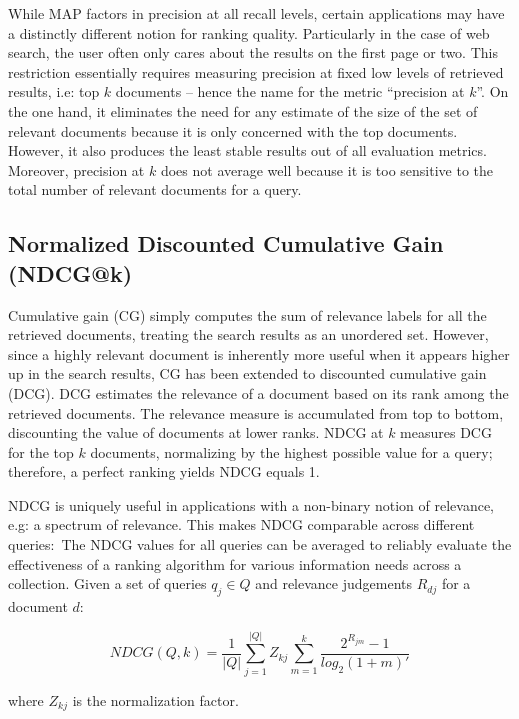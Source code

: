 While MAP factors in precision at all recall levels, certain applications may have a distinctly different notion for ranking quality.
Particularly in the case of web search, the user often only cares about the results on the first page or two.
This restriction essentially requires measuring precision at fixed low levels of retrieved results, i.e: top $ k $ documents -- hence the name for the metric ``precision at $ k $''.
On the one hand, it eliminates the need for any estimate of the size of the set of relevant documents because it is only concerned with the top documents.
However, it also produces the least stable results out of all evaluation metrics.
Moreover, precision at $ k $ does not average well because it is too sensitive to the total number of relevant documents for a query.

\subsection{Normalized Discounted Cumulative Gain (NDCG@k)}

Cumulative gain (CG) simply computes the sum of relevance labels for all the retrieved documents, treating the search results as an unordered set.
However, since a highly relevant document is inherently more useful when it appears higher up in the search results, CG has been extended to discounted cumulative gain (DCG).
DCG estimates the relevance of a document based on its rank among the retrieved documents.
The relevance measure is accumulated from top to bottom, discounting the value of documents at lower ranks.
NDCG at $ k $ measures DCG for the top $ k $ documents, normalizing by the highest possible value for a query; therefore, a perfect ranking yields NDCG equals 1.

NDCG is uniquely useful in applications with a non-binary notion of relevance, e.g: a spectrum of relevance.
This makes NDCG comparable across different queries:\
The NDCG values for all queries can be averaged to reliably evaluate the effectiveness of a ranking algorithm for various information needs across a collection.
Given a set of queries $ q_j \in Q $ and relevance judgements $ R_{dj} $ for a document $ d $:\

\begin{equation}
NDCG(Q, k) = \frac{1}{|Q|} \sum ^{|Q|} _{j = 1} Z_{kj} \sum ^k _{m = 1} \frac{2^{R_{jm}} - 1}{log_2 (1 + m)'}
\end{equation}

where $ Z_{kj} $ is the normalization factor.

